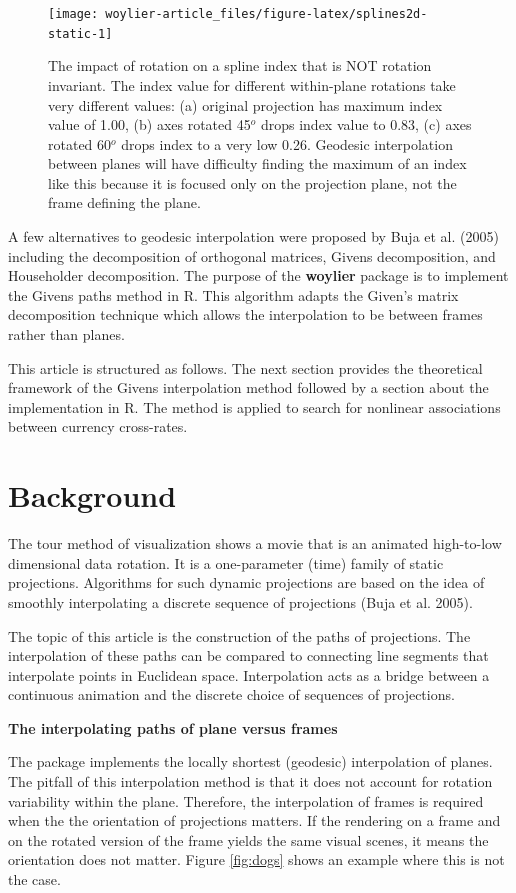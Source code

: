 \begin{figure}
\texttt{[image: woylier-article\_files/figure-latex/splines2d-static-1]} \caption{The impact of rotation on a spline index that is NOT rotation invariant. The index value for different within-plane rotations take very different values: (a) original projection has maximum index value of 1.00, (b) axes rotated 45$^o$ drops index value to 0.83, (c) axes rotated 60$^o$ drops index to a very low 0.26. Geodesic interpolation between planes will have difficulty finding the maximum of an index like this because it is focused only on the projection plane, not the frame defining the plane.}\label{fig:splines2d-static}
\end{figure}

A few alternatives to geodesic interpolation were proposed by Buja et al. (2005) including the decomposition of orthogonal matrices, Givens decomposition, and Householder decomposition. The purpose of the \textbf{woylier} package is to implement the Givens paths method in R. This algorithm adapts the Given's matrix decomposition technique which allows the interpolation to be between frames rather than planes.

This article is structured as follows. The next section provides the theoretical framework of the Givens interpolation method followed by a section about the implementation in R. The method is applied to search for nonlinear associations between currency cross-rates.

\hypertarget{background}{%
\section{Background}\label{background}}

The tour method of visualization shows a movie that is an animated high-to-low dimensional data rotation. It is a one-parameter (time) family of static projections. Algorithms for such dynamic projections are based on the idea of smoothly interpolating a discrete sequence of projections (Buja et al. 2005).

The topic of this article is the construction of the paths of projections. The interpolation of these paths can be compared to connecting line segments that interpolate points in Euclidean space. Interpolation acts as a bridge between a continuous animation and the discrete choice of sequences of projections.

\textbf{The interpolating paths of plane versus frames}

The  package implements the locally shortest (geodesic) interpolation of planes. The pitfall of this interpolation method is that it does not account for rotation variability within the plane. Therefore, the interpolation of frames is required when the the orientation of projections matters. If the rendering on a frame and on the rotated version of the frame yields the same visual scenes, it means the orientation does not matter. Figure \ref{fig:dogs} shows an example where this is not the case.


